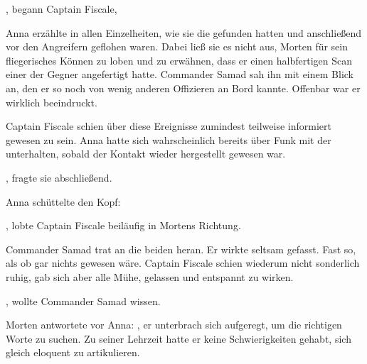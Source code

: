 , begann Captain Fiscale, 

\par

Anna erzählte in allen Einzelheiten, wie sie die  gefunden hatten und anschließend vor den Angreifern geflohen waren. Dabei ließ sie es nicht aus, Morten für sein fliegerisches Können zu loben und zu erwähnen, dass er einen halbfertigen Scan einer der Gegner angefertigt hatte. Commander Samad sah ihn mit einem Blick an, den er so noch von wenig anderen Offizieren an Bord kannte. Offenbar war er wirklich beeindruckt.

\par

Captain Fiscale schien über diese Ereignisse zumindest teilweise informiert gewesen zu sein. Anna hatte sich wahrscheinlich bereits über Funk mit der  unterhalten, sobald der Kontakt wieder hergestellt gewesen war.

\par

, fragte sie abschließend.

\par

Anna schüttelte den Kopf: 

\par

, lobte Captain Fiscale beiläufig in Mortens Richtung.

\par

Commander Samad trat an die beiden heran. Er wirkte seltsam gefasst. Fast so, als ob gar nichts gewesen wäre. Captain Fiscale schien wiederum nicht sonderlich ruhig, gab sich aber alle Mühe, gelassen und entspannt zu wirken.

\par

, wollte Commander Samad wissen.

\par

Morten antwortete vor Anna: , er unterbrach sich aufgeregt, um die richtigen Worte zu suchen. Zu seiner Lehrzeit hatte er keine Schwierigkeiten gehabt, sich gleich eloquent zu artikulieren. 

